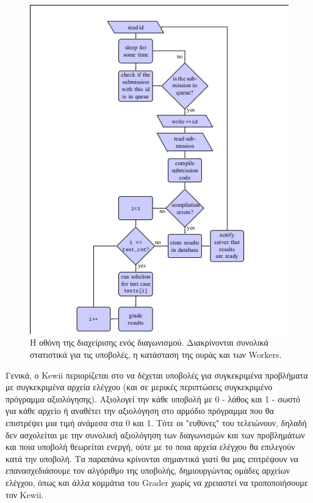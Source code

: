 \documentclass[diploma]{softlab-thesis}
\begin{document}
\begin{figure}
  \centering
  \includegraphics[scale=0.3]{Figures/graderflow.png}
  \caption[Οθόνη διαχείρισης προβλήματος]{Η οθόνη της διαχείρισης ενός διαγωνισμού.
  Διακρίνονται συνολικά στατιστικά για τις υποβολές, η κατάσταση της ουράς και των
  Workers.}
\end{figure}

\bigskip

Γενικά, ο Kewii περιορίζεται στο να δέχεται υποβολές για συγκεκριμένα προβλήματα
με συγκεκριμένα αρχεία ελέγχου (και σε μερικές περιπτώσεις συγκεκριμένο πρόγραμμα
αξιολόγησης). Αξιολογεί την κάθε υποβολή με 0 - λάθος και 1 - σωστό για κάθε αρχείο
ή αναθέτει την αξιολόγηση στο αρμόδιο πρόγραμμα που θα επιστρέψει μια τιμή ανάμεσα
στα 0 και 1. Τότε οι "ευθύνες" του τελειώνουν, δηλαδή δεν ασχολείται με την συνολική
αξιολόγηση των διαγωνισμών και των προβλημάτων και ποια υποβολή θεωρείται ενεργή,
ούτε με το ποια αρχεία ελέγχου θα επιλεγούν κατά την υποβολή. Τα παραπάνω κρίνονται
σημαντικά γιατί θα μας επιτρέψουν να επανασχεδιάσουμε τον αλγόριθμο της υποβολής,
δημιουργώντας ομάδες αρχείων ελέγχου, όπως και άλλα κομμάτια του Grader χωρίς να
χρειαστεί να τροποποιήσουμε τον Kewii.
\end{document}

